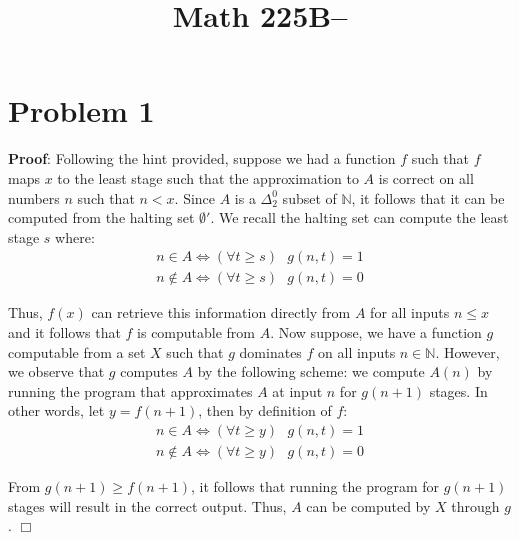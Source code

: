 \documentclass[11pt]{article}
\title{Math 225B--\Homework}
\author{\Name}
\def\endproofmark{$\Box$}
\newenvironment{proof}{\par{\bf Proof}:}{\endproofmark\smallskip}
\begin{document}
\maketitle 

\section*{Problem 1}
\begin{proof}
 Following the hint provided, suppose we had a function $f$ such that $f$ maps $x$ to the least stage such that the approximation to $A$ is correct on all numbers $n$ such that $n < x$. Since $A$ is a $\Delta^0_2$ subset of $\mathbb{N}$, it follows that it can be computed from the halting set $\emptyset'$. We recall the halting set can compute the least stage $s$ where:
 \begin{gather*}
  n \in A \Leftrightarrow (\forall t \geq s) \text{ } g(n,t) = 1 \\
  n \not\in A \Leftrightarrow (\forall t \geq s) \text{ } g(n,t) = 0
 \end{gather*}

 Thus, $f(x)$ can retrieve this information directly from $A$ for all inputs $n \leq x$ and it follows that $f$ is computable from $A$. Now suppose, we have a function $g$ computable from a set $X$ such that $g$ dominates $f$ on all inputs $n \in \mathbb{N}$. However, we observe that $g$ computes $A$ by the following scheme:
 we compute $A(n)$ by running the program that approximates $A$ at input $n$ for $g(n+1)$ stages. In other words, let $y = f(n+1)$, then by definition of $f$:
 \begin{gather*}
  n \in A \Leftrightarrow (\forall t \geq y) \text{ } g(n,t) = 1 \\
  n \not\in A \Leftrightarrow (\forall t \geq y) \text{ } g(n,t) = 0
 \end{gather*}
 
 From $g(n+1) \geq f(n+1)$, it follows that running the program for $g(n+1)$ stages will result in the correct output. Thus, $A$ can be computed by $X$ through $g$. \end{proof}
\end{document}
